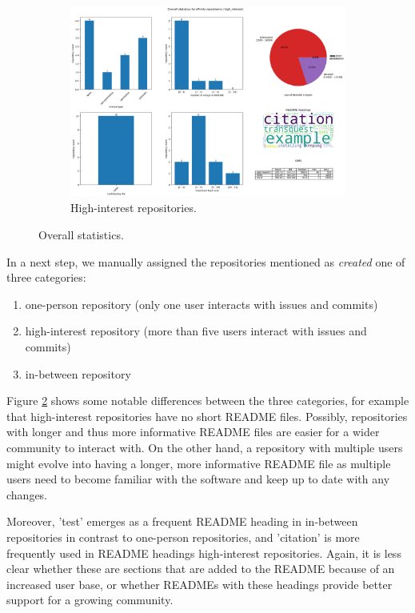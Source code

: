 \documentclass[10pt,a4paper]{scrartcl}
\begin{document}
\begin{figure}[h]
\begin{subfigure}[t]{0.8\textwidth}
        \includegraphics[width=\textwidth]{../analysis/overall/overall_high_interest.png}
        \caption{High-interest repositories.}
        \label{fig:overall_hi}
    \end{subfigure}
    \caption{Overall statistics.}
    \label{fig:overall_cats}
\end{figure}

In a next step, we manually assigned the repositories mentioned as \textit{created} one of three categories: 
\begin{enumerate}
    \item one-person repository (only one user interacts with issues and commits)
    \item high-interest repository (more than five users interact with issues and commits) 
    \item in-between repository
\end{enumerate}
Figure \ref{fig:overall_cats} shows some notable differences between the three categories, for example that
high-interest repositories have no short README files.
Possibly, repositories with longer and thus more informative README files are easier for a wider community to interact with.
On the other hand, a repository with multiple users might evolve into having a longer, more informative README file
as multiple users need to become familiar with the software and keep up to date with any changes.

Moreover,  'test' emerges as a frequent README heading in in-between repositories
in contrast to one-person repositories,
and 'citation' is more frequently used in README headings high-interest repositories.
Again, it is less clear whether these are sections that are added to the README because of an increased user base,
or whether READMEs with these headings provide better support for a growing community.
\end{document}
